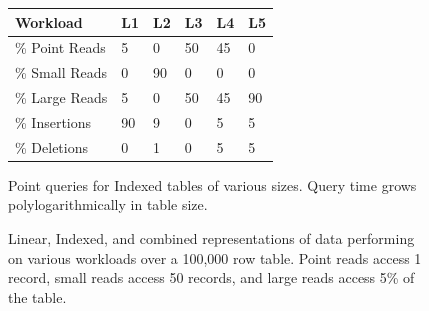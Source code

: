 \documentclass[letterpaper,twocolumn,10pt]{article}
\begin{document}
\begin{figure}
\begin{minipage}{0.64\textwidth}
\begin{minipage}{.5\textwidth}
\end{minipage}
      \begin{minipage}{.5\textwidth}\vspace{.2cm}
\centering
\small
\setlength\tabcolsep{3.5pt}
\begin{tabular}{llllll}
\textbf{Workload}&L1&L2&L3&L4& L5\\\hline
\% Point Reads & 5& 0& 50& 45& 0\\
\% Small Reads & 0& 90& 0& 0& 0\\
\% Large Reads & 5&0&50&45&90\\
\% Insertions& 90& 9& 0& 5& 5\\
\% Deletions & 0& 1& 0& 5& 5\\
\end{tabular}
\end{minipage}
    \end{minipage}
    \begin{minipage}{.32\textwidth}
    		\caption{\small Point queries for Indexed tables of various sizes. Query time grows polylogarithmically in table size.}
		\label{figScaling}
    \end{minipage}\hspace{.2cm}
    \begin{minipage}{.64\textwidth}
    \caption{\small Linear, Indexed, and combined representations of data performing on various workloads over a 100,000 row table. Point reads access 1 record, small reads access 50 records, and large reads access 5\% of the table.}
\label{figworkload}
    \end{minipage}
\end{figure}
\end{document}
